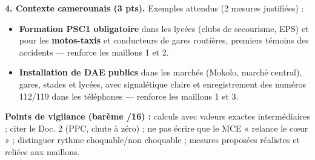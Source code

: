 \documentclass[11pt]{article}
\begin{document}
\begin{corrige}
\textbf{4. Contexte camerounais (3 pts).} Exemples attendus (2 mesures justifiées) :
\begin{itemize}
    \item \textbf{Formation PSC1 obligatoire} dans les lycées (clubs de secourisme, EPS) et pour les \textbf{motos-taxis} et conducteurs de gares routières, premiers témoins des accidents — renforce les maillons 1 et 2.
    \item \textbf{Installation de DAE publics} dans les marchés (Mokolo, marché central), gares, stades et lycées, avec signalétique claire et enregistrement des numéros 112/119 dans les téléphones — renforce les maillons 1 et 3.
\end{itemize}
\textbf{Points de vigilance (barème /16) :} calculs avec valeurs exactes intermédiaires ; citer le Doc. 2 (PPC, chute à zéro) ; ne pas écrire que le MCE « relance le cœur » ; distinguer rythme choquable/non choquable ; mesures proposées réalistes et reliées aux maillons.
\end{corrige}
\end{document}
